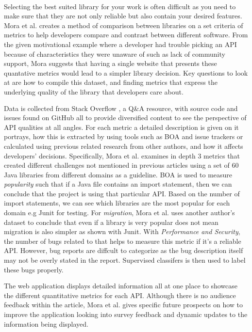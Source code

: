 \documentclass[12pt]{article}
\begin{document}
\paragraph{}
Selecting the best suited library for your work is often difficult as you need to make sure that they are not only reliable but also contain your desired features.
Mora et al. \cite{metrics} creates a method of comparison between libraries on a set criteria of metrics to help developers
compare and contrast between different software. 
From the given motivational example where a developer had trouble picking an API because of characteristics they were unaware of such as lack of community support,
Mora suggests that having a single website that presents these quantative metrics would lead to a simpler library decision.
Key questions to look at are how to compile this dataset, and finding metrics that express the underlying quality of the library that developers care about.

Data is collected from Stack Overflow \cite{stackoverflow}, a Q\&A resource, with source code and issues found on GitHub \cite{github} all to provide
diversified content to see the perspective of API qualities at all angles. 
For each metric a detailed description is given on it portrays, how this is extracted by using tools such as BOA \cite{boa} and issue trackers
or calculated using previous related research from other authors, and how it affects developers' decisions.
Specifically, Mora et al.\cite{metrics} examines in depth 3 metrics that created different challenges not mentioned in previous articles using a set of 60 Java libraries from different domains as a guideline.
BOA \cite{boa} is used to measure \textit{popularity} such that if a Java file contains an import statement, then we can conclude that the project is using that particular API.
Based on the number of import statements, we can see which libraries are the most popular for each domain e.g Junit for testing.
For \textit{migration}, Mora et al.\cite{metrics} uses another author's dataset to conclude that even if a library is very popular does not mean migration is also simpler as shown with Junit.
With \textit{Performance and Security}, the number of bugs related to that helps to measure this metric if it's a reliable API.
However, bug reports are diffcult to categorize as the bug description itself may not be overly stated in the report.
Supervised classifers is then used to label these bugs properly.

The web application displays detailed information all at one place to showcase the different quantitative metrics for each API. 
Although there is no audience feedback within the article, Mora et al. \cite{metrics} gives specific future prospects on how
to improve the application looking into survey feedback and dynamic updates to the information being displayed. 
\end{document}
